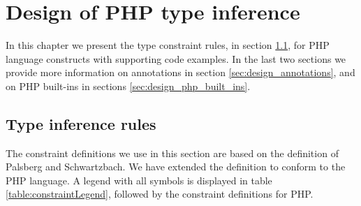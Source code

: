 \documentclass[../main.tex]{subfiles}
\begin{document}
    \chapter{Design of PHP type inference}\label{ch:inference_design}

	In this chapter we present the type constraint rules, in section \ref{sec:design_type_constraint_rules}, for PHP language constructs with supporting code examples.
	In the last two sections we provide more information on annotations in section \ref{sec:design_annotations}, and on PHP built-ins in sections \ref{sec:design_php_built_ins}.

    \section{Type inference rules}\label{sec:design_type_constraint_rules}

    The constraint definitions we use in this section are based on the definition of Palsberg and Schwartzbach\cite{Pal:94}.
    We have extended the definition to conform to the PHP language.
    A legend with all symbols is displayed in table \ref{table:constraintLegend}, followed by the constraint definitions for PHP.
\end{document}
